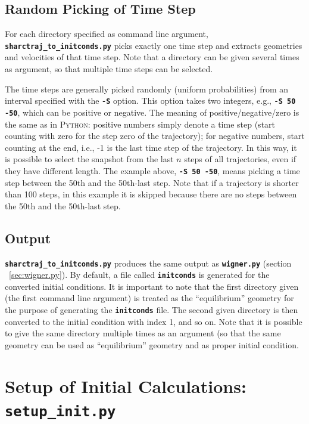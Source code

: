 \documentclass[a4paper,10pt,DIV=15,openany]{scrbook}
\newcommand{\ttt}[1]{\textbf{\texttt{#1}}}
\begin{document}
\subsection{Random Picking of Time Step}

For each directory specified as command line argument, \ttt{sharctraj\_to\_initconds.py} picks exactly one time step and extracts geometries and velocities of that time step.
Note that a directory can be given several times as argument, so that multiple time steps can be selected.

The time steps are generally picked randomly (uniform probabilities) from an interval specified with the \ttt{-S} option.
This option takes two integers, e.g., \ttt{-S 50 -50}, which can be positive or negative.
The meaning of positive/negative/zero is the same as in \textsc{Python}: positive numbers simply denote a time step (start counting with zero for the step zero of the trajectory); for negative numbers, start counting at the end, i.e., -1 is the last time step of the trajectory.
In this way, it is possible to select the snapshot from the last $n$ steps of all trajectories, even if they have different length.
The example above, \ttt{-S 50 -50}, means picking a time step between the 50th and the 50th-last step. Note that if a trajectory is shorter than 100 steps, in this example it is skipped because there are no steps between the 50th and the 50th-last step.

\subsection{Output}

\ttt{sharctraj\_to\_initconds.py} produces the same output as \ttt{wigner.py} (section ~\ref{sec:wigner.py}).
By default, a file called \ttt{initconds} is generated for the converted initial conditions. 
It is important to note that the first directory given (the first command line argument) is treated as the ``equilibrium'' geometry for the purpose of generating the \ttt{initconds} file.
The second given directory is then converted to the initial condition with index 1, and so on.
Note that it is possible to give the same directory multiple times as an argument (so that the same geometry can be used as ``equilibrium'' geometry and as proper initial condition.



\section{Setup of Initial Calculations: \ttt{setup\_init.py}}\label{sec:setup_init.py}
\end{document}
